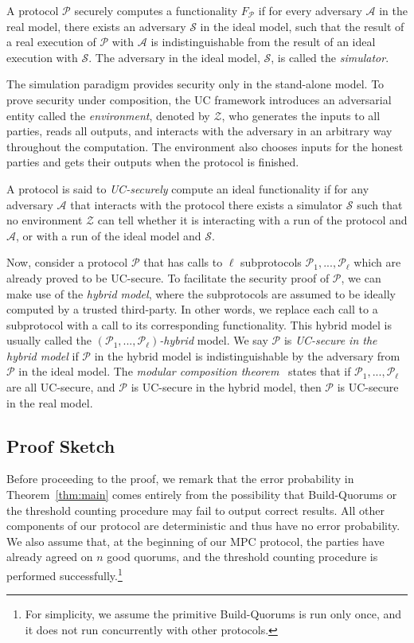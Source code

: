 \documentclass[11pt,letter]{article}
\newcommand{\alg}[1]{\mbox{\textsf{#1}}}
\newcommand{\func}[1]{\mbox{$F_\textsf{#1}$}}
\theoremstyle{mytheoremstyle}
\begin{document}
A protocol $\mathcal{P}$ securely computes a functionality \func{$\mathcal{P}$} if for every adversary $\mathcal{A}$ in the real model, there exists an adversary $\mathcal{S}$ in the ideal model, such that the result of a real execution of $\mathcal{P}$ with $\mathcal{A}$ is indistinguishable from the result of an ideal execution with $\mathcal{S}$. The adversary in the ideal model, $\mathcal{S}$, is called the \emph{simulator}.



The simulation paradigm provides security only in the stand-alone model. To prove security under composition, the UC framework introduces an adversarial entity called the \emph{environment}, denoted by $\mathcal{Z}$, who generates the inputs to all parties, reads all outputs, and interacts with the adversary in an arbitrary way throughout the computation. The environment also chooses inputs for the honest parties and gets their outputs when the protocol is finished.

A protocol is said to \emph{UC-securely} compute an ideal functionality if for any adversary $\mathcal{A}$ that interacts with the protocol there exists a simulator $\mathcal{S}$ such that no environment $\mathcal{Z}$ can tell whether it is interacting with a run of the protocol and $\mathcal{A}$, or with a run of the ideal model and $\mathcal{S}$.

Now, consider a protocol $\mathcal{P}$ that has calls to $\ell$ subprotocols $\mathcal{P}_1,...,\mathcal{P}_\ell$ which are already proved to be UC-secure. To facilitate the security proof of $\mathcal{P}$, we can make use of the \emph{hybrid model}, where the subprotocols are assumed to be ideally computed by a trusted third-party. In other words, we replace each call to a subprotocol with a call to its corresponding functionality. This hybrid model is usually called the \emph{$(\mathcal{P}_1,...,\mathcal{P}_\ell)$-hybrid} model. We say $\mathcal{P}$ is \emph{UC-secure in the hybrid model} if $\mathcal{P}$ in the hybrid model is indistinguishable by the adversary from $\mathcal{P}$ in the ideal model.
The \emph{modular composition theorem}~\cite{Canetti:2000:JC:0933-2790} states that if $\mathcal{P}_1,...,\mathcal{P}_\ell$ are all UC-secure, and $\mathcal{P}$ is UC-secure in the hybrid model, then $\mathcal{P}$ is UC-secure in the real model.

\subsection{Proof Sketch} \label{sec:ucproof}
Before proceeding to the proof, we remark that the error probability in Theorem~\ref{thm:main} comes entirely from the possibility that \alg{Build-Quorums} or the threshold counting procedure may fail to output correct results. All other components of our protocol are deterministic and thus have no error probability. We also assume that, at the beginning of our MPC protocol, the parties have already agreed on $n$ good quorums, and the threshold counting procedure is performed successfully.\footnote{For simplicity, we assume the primitive \alg{Build-Quorums} is run only once, and it does not run concurrently with other protocols.}
\end{document}
